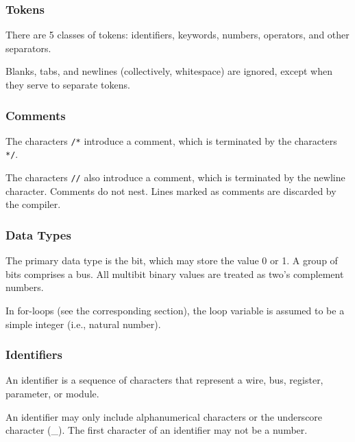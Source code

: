 \documentclass[letterpaper,11pt]{article}
\begin{document}
        \subsubsection{Tokens}
        There are 5 classes of tokens: identifiers, keywords, numbers, operators, and other separators.
        
        Blanks, tabs, and newlines (collectively, whitespace) are ignored, except when they serve
        to separate tokens.
        
        \subsubsection{Comments}
        The characters \texttt{/*} introduce a comment, which is terminated by the characters \texttt{*/}.
        
        The characters \texttt{//} also introduce a comment, which is terminated by the newline character. Comments do not 
        nest. Lines marked as comments are discarded by the compiler.
        
        \subsubsection{Data Types}
        The primary data type is the bit, which may store the value 0 or 1. A group of bits comprises a bus. All 
        multibit binary values are treated as two's complement numbers.
        
        In for-loops (see the corresponding section), the loop variable is assumed to be a simple integer (i.e., 
        natural number).
        
        \subsubsection{Identifiers}
        An identifier is a sequence of characters that represent a wire, bus, register, parameter, or module. 
        
        An identifier may only include alphanumerical characters or the underscore character (\_). The first character 
        of an identifier may not be a number.
        
\end{document}

